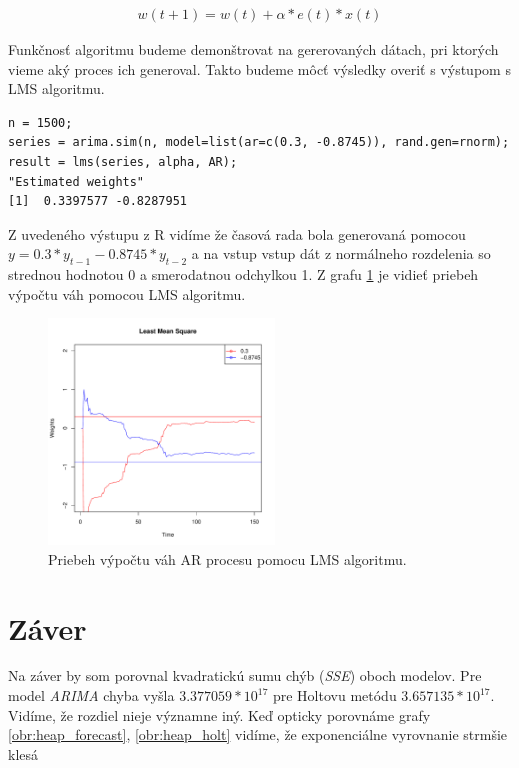 \documentclass[12pt,a4paper,oneside,final]{article}
\theoremstyle{definition}
\theoremstyle{remark}
\numberwithin{equation}{section}
\begin{document}
\begin{eqnarray} \label{lms}
    w(t+1) = w(t) + \alpha * e(t) * x(t)
\end{eqnarray}

Funkčnosť algoritmu budeme demonštrovat na gererovaných dátach, pri ktorých vieme 
aký proces ich generoval. Takto budeme môcť výsledky overiť s výstupom s LMS algoritmu.

\begin{minipage}{\linewidth}
\begingroup
\fontsize{9pt}{7pt}\selectfont
\begin{verbatim}
n = 1500;
series = arima.sim(n, model=list(ar=c(0.3, -0.8745)), rand.gen=rnorm);
result = lms(series, alpha, AR);
"Estimated weights"
[1]  0.3397577 -0.8287951
\end{verbatim}
\endgroup
\end{minipage}

Z uvedeného výstupu z R vidíme že časová rada bola generovaná pomocou
$y = 0.3*y_{t-1} - 0.8745*y_{t-2}$ a na vstup vstup dát z normálneho rozdelenia so
strednou hodnotou 0 a smerodatnou odchylkou 1. Z grafu \ref{obr:lms} je vidieť priebeh
výpočtu váh pomocou LMS algoritmu.

\begin{figure}[H]
    \begin{center}
        \includegraphics[width=.8\textwidth,height=6cm]{images/lms.pdf}
        \caption{Priebeh výpočtu váh AR procesu pomocu LMS algoritmu.}
        \label{obr:lms}
    \end{center}
\end{figure}

\section{Záver}
Na záver by som porovnal kvadratickú sumu chýb (\emph{SSE}) oboch modelov. Pre
model \emph{ARIMA} chyba vyšla $3.377059*10^17$ pre Holtovu metódu $3.657135*10^17$. 
Vidíme, že rozdiel nieje významne iný. Keď opticky porovnáme grafy \ref{obr:heap_forecast},
\ref{obr:heap_holt} vidíme, že exponenciálne vyrovnanie strmšie klesá
\end{document}
